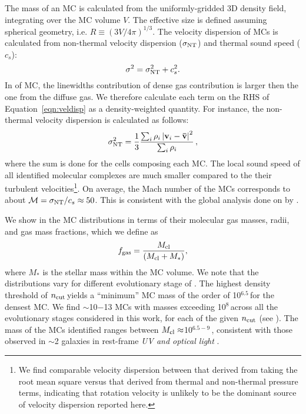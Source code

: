 \IfFileExists{emulateapjlegacy.cls}{\documentclass[iop]{emulateapjlegacy}}{\documentclass[iop]{emulateapj}}
\begin{document}
The mass of an MC is calculated from the uniformly-gridded 3D density field, integrating over the MC volume $V$. The effective size is defined assuming spherical geometry, i.e. $R \equiv (3 V /4 \pi)^{1/3}$.
%
The velocity dispersion of MCs is calculated from non-thermal velocity dispersion ($\sigma_{\rm NT}$) and thermal sound speed ($c_s$):
\begin{equation}
\sigma^2 = \sigma_{\rm NT}^2 + c_s^2.
\label{eqn:veldisp}
\end{equation}
% 
In \obs of MC, the linewidths contribution of dense gas contribution is larger then the one from the diffuse gas. We therefore calculate 
each term on the RHS of Equation~\ref{eqn:veldisp} as a density-weighted quantity. For instance, the non-thermal velocity dispersion is 
calculated as follows:
\begin{equation}
\sigma_{\rm NT}^2 = \frac{1}{{3}}\frac{\sum_{i} \rho_i \left|\mathbf{v}_i - \mathbf{\bar v}\right|^2}{\sum_i \rho_i}\,,
\end{equation}
where the sum is done for the cells composing each MC.
The local sound speed of all identified molecular complexes are much smaller compared to the their turbulent velocities\footnote{We find comparable velocity dispersion between that derived from taking the root mean square versus that derived from thermal and non-thermal pressure terms, indicating that rotation velocity is unlikely to be the dominant source of velocity dispersion reported here.}. On average, the Mach number of the MCs corresponds to about $\mathcal{M} = \sigma_{\rm NT}/c_s\approx 50$. This is consistent with the global analysis done on \flower by \citet{Vallini18a}.

We show in  the MC distributions in terms of their molecular gas masses, radii, and gas mass fractions, which we define as
\begin{equation}
f_{\rm gas} = \frac{M_{\rm cl}} {\left(M_{\rm cl} + M_*\right)},
\end{equation}
where $M_*$ is the stellar mass within the MC volume.
%
We note that the distributions vary for different evolutionary stage of \flower. The highest density threshold of $n_{\rm cut}$\,\cc yields a ``minimum'' MC mass of the order of 10$^{6.5}$\,\Msun for the densest MC.
%
We find $\sim$10$-$13 MCs with masses exceeding 10$^8$\,\Msun across all the evolutionary stages considered in this work,
for each of the given $n_{\rm cut}$ (see ). The mass of the MCs identified ranges between $M_{\rm cl}\approx$10$^{6.5-9}$\,\Msun, consistent with those observed in \z$\sim$2 galaxies in rest-frame {\it UV and optical light} \citep{Elmegreen07a, Elmegreen09a}.
\end{document}
